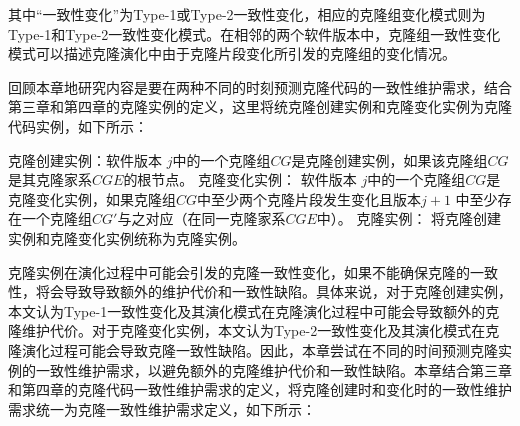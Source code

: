 
其中“一致性变化”为Type-1或Type-2一致性变化，相应的克隆组变化模式则为Type-1和Type-2一致性变化模式。在相邻的两个软件版本中，克隆组一致性变化模式可以描述克隆演化中由于克隆片段变化所引发的克隆组的变化情况。

回顾本章地研究内容是要在两种不同的时刻预测克隆代码的一致性维护需求，结合第三章和第四章的克隆实例的定义，这里将统克隆创建实例和克隆变化实例为克隆代码实例，如下所示：\\

\begin{definition}
\label{def-instance}
克隆创建实例：软件版本 $j$中的一个克隆组$CG$是克隆创建实例，如果该克隆组$CG$是其克隆家系$CGE$的根节点。
克隆变化实例：
软件版本 $j$中的一个克隆组$CG$是克隆变化实例，如果克隆组$CG$中至少两个克隆片段发生变化且版本$j+1$ 中至少存在一个克隆组$CG'$与之对应（在同一克隆家系$CGE$中）。 
克隆实例： 将克隆创建实例和克隆变化实例统称为克隆实例。
\end{definition}



克隆实例在演化过程中可能会引发的克隆一致性变化，如果不能确保克隆的一致性，将会导致导致额外的维护代价和一致性缺陷。具体来说，对于克隆创建实例，本文认为Type-1一致性变化及其演化模式在克隆演化过程中可能会导致额外的克隆维护代价。对于克隆变化实例，本文认为Type-2一致性变化及其演化模式在克隆演化过程可能会导致克隆一致性缺陷。因此，本章尝试在不同的时间预测克隆实例的一致性维护需求，以避免额外的克隆维护代价和一致性缺陷。本章结合第三章和第四章的克隆代码一致性维护需求的定义，将克隆创建时和变化时的一致性维护需求统一为克隆一致性维护需求定义，如下所示：\\

